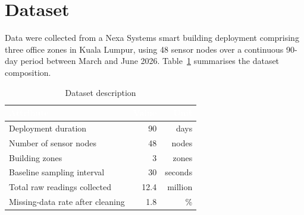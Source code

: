\section{Dataset}

Data were collected from a Nexa Systems smart building deployment comprising three office zones in
Kuala Lumpur, using 48 sensor nodes over a continuous 90-day period between March and June 2026.
Table~\ref{tab:dataset} summarises the dataset composition.

\begin{table}[htbp]
\centering
\caption{Dataset description}
\label{tab:dataset}
\begin{tabularx}{\textwidth}{@{}Xrr@{}}
\toprule
\rowcolor{umslate}
\textcolor{white}{\textbf{Attribute}} & \textcolor{white}{\textbf{Value}} & \textcolor{white}{\textbf{Unit}} \\
\midrule
Deployment duration & 90 & days \\
Number of sensor nodes & 48 & nodes \\
Building zones & 3 & zones \\
Baseline sampling interval & 30 & seconds \\
Total raw readings collected & 12.4 & million \\
Missing-data rate after cleaning & 1.8 & \% \\
\bottomrule
\end{tabularx}
\end{table}
